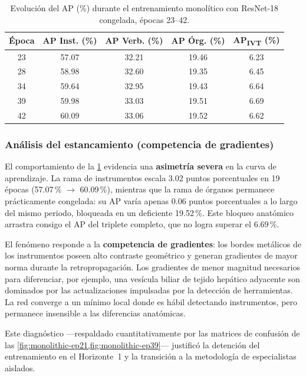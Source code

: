 \documentclass[11pt]{article}
\begin{document}
\begin{table}[htbp]
    \centering
    \caption{Evolución del AP (\%) durante el entrenamiento monolítico con ResNet-18 congelada, épocas 23--42.}
    \label{tab:monolitico}
    \small
    \begin{tabular}{@{}ccccc@{}}
        \toprule
        \textbf{Época} & \textbf{AP Inst. (\%)} & \textbf{AP Verb. (\%)} & \textbf{AP Órg. (\%)} & \textbf{AP\textsubscript{IVT} (\%)} \\
        \midrule
        23 & 57.07 & 32.21 & 19.46 & 6.23 \\
        28 & 58.98 & 32.60 & 19.35 & 6.45 \\
        34 & 59.64 & 32.95 & 19.43 & 6.64 \\
        39 & 59.98 & 33.03 & 19.51 & 6.69 \\
        42 & 60.09 & 33.06 & 19.52 & 6.62 \\
        \bottomrule
    \end{tabular}
\end{table}

\subsubsection*{Análisis del estancamiento (competencia de gradientes)}

El comportamiento de la \cref{tab:monolitico} evidencia una \textbf{asimetría severa} en la curva de aprendizaje. La rama de instrumentos escala 3.02 puntos porcentuales en 19 épocas (57.07\,\% $\rightarrow$ 60.09\,\%), mientras que la rama de órganos permanece prácticamente congelada: su AP varía apenas 0.06 puntos porcentuales a lo largo del mismo periodo, bloqueada en un deficiente 19.52\,\%. Este bloqueo anatómico arrastra consigo el AP del triplete completo, que no logra superar el 6.69\,\%.

El fenómeno responde a la \textbf{competencia de gradientes}: los bordes metálicos de los instrumentos poseen alto contraste geométrico y generan gradientes de mayor norma durante la retropropagación. Los gradientes de menor magnitud necesarios para diferenciar, por ejemplo, una vesícula biliar de tejido hepático adyacente son dominados por las actualizaciones impulsadas por la detección de herramientas. La red converge a un mínimo local donde es hábil detectando instrumentos, pero permanece insensible a las diferencias anatómicas.

Este diagnóstico —respaldado cuantitativamente por las matrices de confusión de las \cref{fig:monolithic-ep21,fig:monolithic-ep39}— justificó la detención del entrenamiento en el Horizonte~1 y la transición a la metodología de especialistas aislados.
\end{document}
